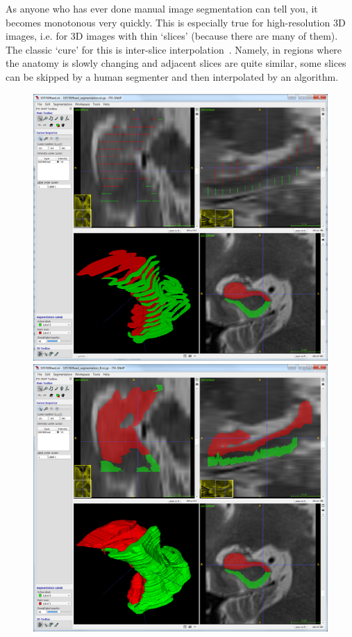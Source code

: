 \documentclass{InsightArticle}
\begin{document}
As anyone who has ever done manual image segmentation can tell you,
it becomes monotonous very quickly.
This is especially true for high-resolution 3D images,
i.e. for 3D images with thin `slices' (because there are many of them).
The classic `cure' for this is inter-slice interpolation~\cite{fig:InOut}.
Namely, in regions where the anatomy is slowly changing and adjacent slices are quite similar,
some slices can be skipped by a human segmenter and then interpolated by an algorithm.

\begin{figure}
\center
\includegraphics[scale=0.265]{In1.png}
\includegraphics[scale=0.265]{Out1.png}

\end{figure}
\end{document}
